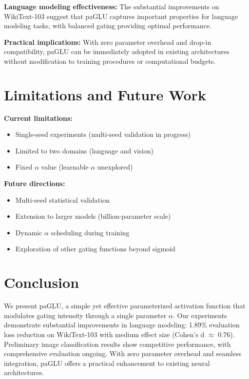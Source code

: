 \documentclass[11pt]{article}
\begin{document}
\textbf{Language modeling effectiveness:} The substantial improvements on WikiText-103 suggest that paGLU captures important properties for language modeling tasks, with balanced gating providing optimal performance.

\textbf{Practical implications:} With zero parameter overhead and drop-in compatibility, paGLU can be immediately adopted in existing architectures without modification to training procedures or computational budgets.

\section{Limitations and Future Work}
\label{sec:limitations}

\textbf{Current limitations:}
\begin{itemize}
    \item Single-seed experiments (multi-seed validation in progress)
    \item Limited to two domains (language and vision)
    \item Fixed $\alpha$ value (learnable $\alpha$ unexplored)
\end{itemize}

\textbf{Future directions:}
\begin{itemize}
    \item Multi-seed statistical validation
    \item Extension to larger models (billion-parameter scale)
    \item Dynamic $\alpha$ scheduling during training
    \item Exploration of other gating functions beyond sigmoid
\end{itemize}

\section{Conclusion}
\label{sec:conclusion}

We present paGLU, a simple yet effective parameterized activation function that modulates gating intensity through a single parameter $\alpha$. Our experiments demonstrate substantial improvements in language modeling: 1.89\% evaluation loss reduction on WikiText-103 with medium effect size (Cohen's d $\approx$ 0.76). Preliminary image classification results show competitive performance, with comprehensive evaluation ongoing. With zero parameter overhead and seamless integration, paGLU offers a practical enhancement to existing neural architectures.
\end{document}
